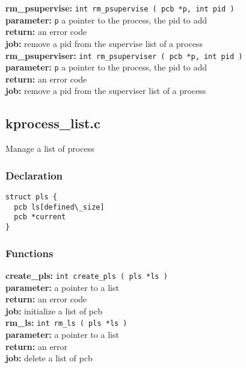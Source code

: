 \noindent\textbf{rm\_psupervise:} \verb+int rm_psupervise ( pcb *p, int pid )+\\
\textbf{parameter:} \verb+p+ a pointer to the process, the pid to add\\
\textbf{return:} an error code\\
\textbf{job:} remove a pid from the supervise list of a process\\

\noindent\textbf{rm\_psuperviser:} \verb+int rm_psuperviser ( pcb *p, int pid )+\\
\textbf{parameter:} \verb+p+ a pointer to the process, the pid to add\\
\textbf{return:} an error code\\
\textbf{job:} remove a pid from the superviser list of a process\\

\subsection{kprocess\_list.c}

Manage a list of process

\subsubsection{Declaration}

\begin{verbatim}
struct pls {
  pcb ls[defined\_size]
  pcb *current
}
\end{verbatim}

\subsubsection{Functions}

\noindent\textbf{create\_pls:} \verb+int create_pls ( pls *ls )+\\
\textbf{parameter:} a pointer to a list\\
\textbf{return:} an error code\\
\textbf{job:} initialize a list of pcb\\

\noindent\textbf{rm\_ls:} \verb+int rm_ls ( pls *ls )+\\
\textbf{parameter:} a pointer to a list\\
\textbf{return:} an error\\
\textbf{job:} delete a list of pcb\\

